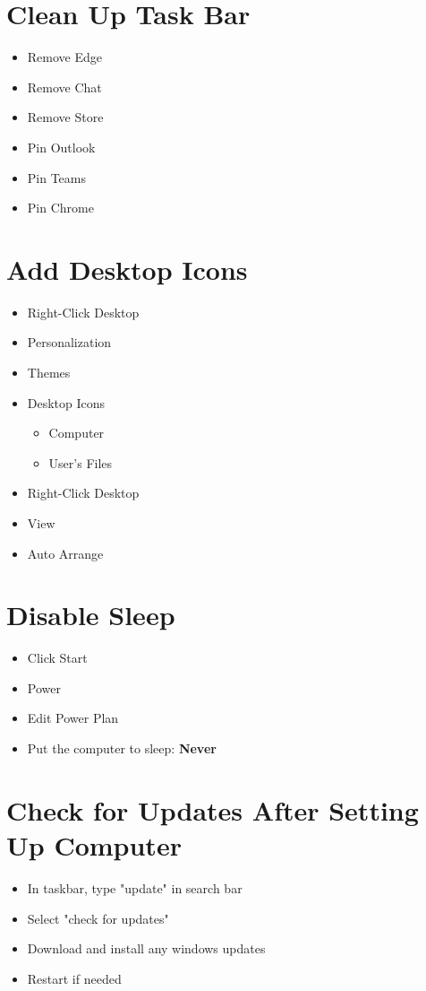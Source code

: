 \documentclass{article}
\begin{document}
\section*{Clean Up Task Bar}
\begin{itemize}
    \item Remove Edge
    \item Remove Chat
    \item Remove Store
    \item Pin Outlook
    \item Pin Teams
    \item Pin Chrome
\end{itemize}

\section*{Add Desktop Icons}
\begin{itemize}
    \item Right-Click Desktop
    \item Personalization
    \item Themes
    \item Desktop Icons
    \begin{itemize}
        \item Computer
        \item User's Files
    \end{itemize}
    \item Right-Click Desktop
    \item View
    \item Auto Arrange
\end{itemize}

\section*{Disable Sleep}
\begin{itemize}
    \item Click Start
    \item Power
    \item Edit Power Plan
    \item Put the computer to sleep: \textbf{Never}
\end{itemize}

\section*{Check for Updates After Setting Up Computer}
\begin{itemize}
    \item In taskbar, type "update" in search bar
    \item Select "check for updates"
    \item Download and install any windows updates
    \item Restart if needed
\end{itemize}
\end{document}

